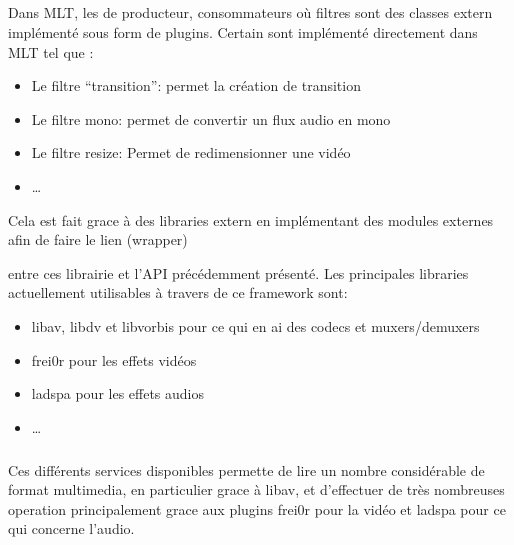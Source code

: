 \subparagraph{}

Dans MLT, les de producteur, consommateurs où filtres sont des classes
extern implémenté sous form de plugins. Certain sont implémenté
directement dans MLT tel que :

\begin{itemize}

  \item {Le filtre ``transition'': permet la création de transition}

  \item {Le filtre mono: permet de convertir un flux audio en mono}

  \item {Le filtre resize: Permet de redimensionner une vidéo}

  \item {\ldots}

\end{itemize}

Cela est fait grace à des libraries extern en implémentant des modules
externes afin de faire le lien (wrapper)

 entre ces librairie et l'API précédemment
présenté. Les principales libraries actuellement utilisables à travers
de ce framework sont:

\begin{itemize}

  \item {libav, libdv et libvorbis pour ce qui en ai des codecs et
  muxers/demuxers}

  \item {frei0r pour les effets vidéos}

  \item {ladspa pour les effets audios}

  \item {\ldots}

\end{itemize}

\subparagraph{}

Ces différents services disponibles permette de lire un nombre
considérable de format multimedia, en particulier grace à libav,
et d'effectuer de très nombreuses operation principalement grace aux
plugins frei0r pour la vidéo et ladspa pour ce qui concerne l'audio.

